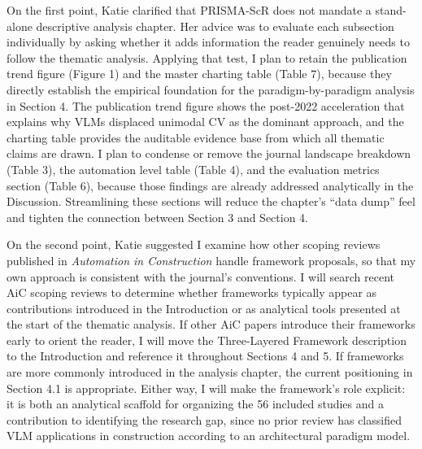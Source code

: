\documentclass[11pt]{article}
\begin{document}
On the first point, Katie clarified that PRISMA-ScR does not mandate a stand-alone descriptive analysis chapter. Her advice was to evaluate each subsection individually by asking whether it adds information the reader genuinely needs to follow the thematic analysis. Applying that test, I plan to retain the publication trend figure (Figure 1) and the master charting table (Table 7), because they directly establish the empirical foundation for the paradigm-by-paradigm analysis in Section 4. The publication trend figure shows the post-2022 acceleration that explains why VLMs displaced unimodal CV as the dominant approach, and the charting table provides the auditable evidence base from which all thematic claims are drawn. I plan to condense or remove the journal landscape breakdown (Table 3), the automation level table (Table 4), and the evaluation metrics section (Table 6), because those findings are already addressed analytically in the Discussion. Streamlining these sections will reduce the chapter's ``data dump'' feel and tighten the connection between Section 3 and Section 4.

On the second point, Katie suggested I examine how other scoping reviews published in \textit{Automation in Construction} handle framework proposals, so that my own approach is consistent with the journal's conventions. I will search recent AiC scoping reviews to determine whether frameworks typically appear as contributions introduced in the Introduction or as analytical tools presented at the start of the thematic analysis. If other AiC papers introduce their frameworks early to orient the reader, I will move the Three-Layered Framework description to the Introduction and reference it throughout Sections 4 and 5. If frameworks are more commonly introduced in the analysis chapter, the current positioning in Section 4.1 is appropriate. Either way, I will make the framework's role explicit: it is both an analytical scaffold for organizing the 56 included studies and a contribution to identifying the research gap, since no prior review has classified VLM applications in construction according to an architectural paradigm model.

\clearpage

\end{document}
